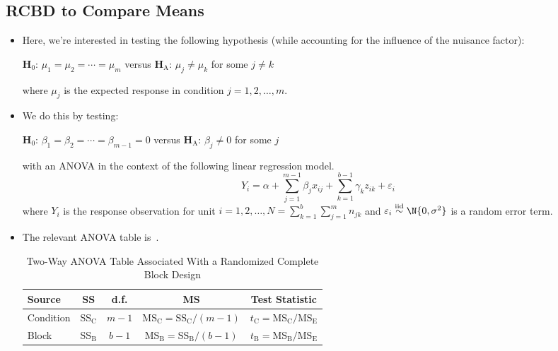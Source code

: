 \subsection{RCBD to Compare Means}
\begin{itemize}
      \item Here, we're interested in testing the following hypothesis (while accounting for the influence of the
            nuisance factor):
            \begin{tightcenter}
                  $ \mathbf{H}_0 $: $ \mu_1=\mu_2=\cdots=\mu_m $ versus $ \mathbf{H}_\text{A} $: $ \mu_j\ne \mu_k $ for some $ j\ne k $
            \end{tightcenter}
            where $ \mu_j $ is the expected response in condition $ j=1,2,\ldots,m $.
      \item We do this by testing:
            \begin{tightcenter}
                  $ \mathbf{H}_0 $: $ \beta_1=\beta_2=\cdots=\beta_{m-1}=0 $ versus $ \mathbf{H}_\text{A} $: $ \beta_j\ne 0 $ for some $ j $
            \end{tightcenter}
            with an ANOVA in the context of the following linear regression model.
            \[ Y_i=\alpha+\sum_{j=1}^{m-1} \beta_j x_{ij}+\sum_{k=1}^{b-1} \gamma_k z_{ik}+\varepsilon_i \]
            where $ Y_i $ is the response observation for unit $ i=1,2,\ldots,N=\sum_{k=1}^{b} \sum_{j=1}^{m} n_{jk} $
            and $ \varepsilon_i \stackrel{\text{iid}}{\sim}\N{0,\sigma^2} $ is a random error term.
      \item The relevant ANOVA table is~.
            \begin{table}[!htbp]
                  \centering
                  \caption{Two-Way ANOVA Table Associated With a Randomized Complete Block Design}\label{two_way_ANOVA_RCBD}
                  \begin{NiceTabular}{|l|c|c|c|c|}
                        \toprule
                        Source    & SS                     & d.f.        & MS                                                                   & Test Statistic                                           \\
                        \midrule
                        Condition & $ \text{SS}_\text{C} $ & $ m-1 $     & $ \text{MS}_\text{C}=\text{SS}_\text{C}/(m-1) $     & $ t_\text{C}=\text{MS}_\text{C}/\text{MS}_\text{E} $ \\
                        Block     & $ \text{SS}_\text{B} $ & $ b-1 $     & $ \text{MS}_\text{B}=\text{SS}_\text{B}/(b-1) $     & $ t_\text{B}=\text{MS}_\text{B}/\text{MS}_\text{E} $ \\

\end{NiceTabular}
\end{table}
\end{itemize}

